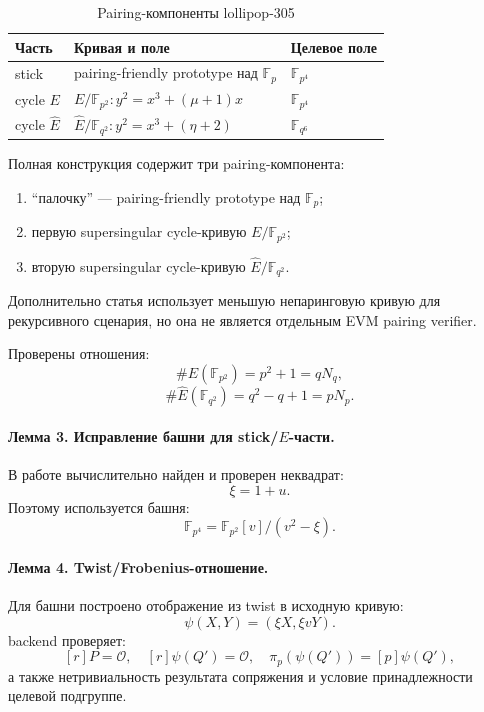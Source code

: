 \documentclass[12pt,a4paper]{article}
\newcommand{\Fp}{\mathbb{F}_p}
\begin{document}
\begin{table}[htbp]
\centering
\caption{Pairing-компоненты lollipop-305}
\small
\begin{tabularx}{\linewidth}{l Y Y}
\toprule
Часть & Кривая и поле & Целевое поле \\
\midrule
stick & pairing-friendly prototype над $\Fp$ & $\mathbb{F}_{p^4}$ \\
cycle $E$ & $E/\mathbb{F}_{p^2}: y^2=x^3+(\mu+1)x$ & $\mathbb{F}_{p^4}$ \\
cycle $\widehat{E}$ &
$\widehat{E}/\mathbb{F}_{q^2}: y^2=x^3+(\eta+2)$ &
$\mathbb{F}_{q^6}$ \\
\bottomrule
\end{tabularx}
\end{table}

Полная конструкция содержит три pairing-компонента:
\begin{enumerate}
    \item ``палочку'' --- pairing-friendly prototype над $\Fp$;
    \item первую supersingular cycle-кривую $E/\mathbb{F}_{p^2}$;
    \item вторую supersingular cycle-кривую
    $\widehat{E}/\mathbb{F}_{q^2}$.
\end{enumerate}
Дополнительно статья использует меньшую непаринговую кривую для рекурсивного
сценария, но она не является отдельным EVM pairing verifier.

Проверены отношения:
\[
    \#E(\mathbb{F}_{p^2})=p^2+1=qN_q,
\]
\[
    \#\widehat{E}(\mathbb{F}_{q^2})=q^2-q+1=pN_p.
\]

\paragraph{Лемма 3. Исправление башни для stick/$E$-части.}
В работе вычислительно найден и проверен неквадрат:
\[
    \xi=1+u.
\]
Поэтому используется башня:
\[
    \mathbb{F}_{p^4}
    =
    \mathbb{F}_{p^2}[v]/(v^2-\xi).
\]

\paragraph{Лемма 4. Twist/Frobenius-отношение.}
Для башни построено отображение из twist в исходную кривую:
\[
    \psi(X,Y)=(\xi X,\xi vY).
\]
backend проверяет:
\[
    [r]P=\mathcal O,\quad
    [r]\psi(Q')=\mathcal O,\quad
    \pi_p(\psi(Q'))=[p]\psi(Q'),
\]
а также нетривиальность результата сопряжения и условие принадлежности
целевой подгруппе.
\end{document}
